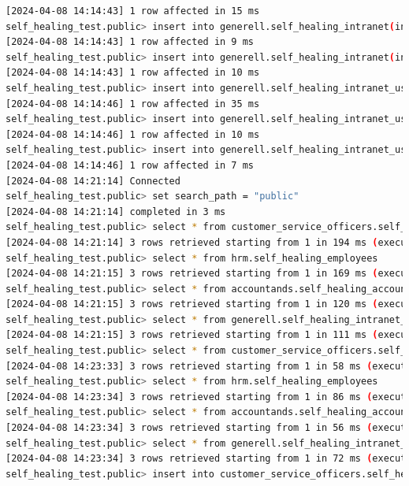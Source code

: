 \begin{flushleft}
\begin{lstlisting}[language=bash, caption=yugabyteDB - Evaluation-Testing,captionpos=b,label={lst:yugabytedb-evaluation-testing},breaklines=true]
[2024-04-08 14:14:43] 1 row affected in 15 ms
self_healing_test.public> insert into generell.self_healing_intranet(intranet_id, content) VALUES (500, 'bla bla')
[2024-04-08 14:14:43] 1 row affected in 9 ms
self_healing_test.public> insert into generell.self_healing_intranet(intranet_id, content) VALUES (1000, 'talking and talking')
[2024-04-08 14:14:43] 1 row affected in 10 ms
self_healing_test.public> insert into generell.self_healing_intranet_users(intranet_user_id, employees_id) values(100, 100)
[2024-04-08 14:14:46] 1 row affected in 35 ms
self_healing_test.public> insert into generell.self_healing_intranet_users(intranet_user_id, employees_id) values(200, 200)
[2024-04-08 14:14:46] 1 row affected in 10 ms
self_healing_test.public> insert into generell.self_healing_intranet_users(intranet_user_id, employees_id) values(300, 300)
[2024-04-08 14:14:46] 1 row affected in 7 ms
[2024-04-08 14:21:14] Connected
self_healing_test.public> set search_path = "public"
[2024-04-08 14:21:14] completed in 3 ms
self_healing_test.public> select * from customer_service_officers.self_healing_accounts
[2024-04-08 14:21:14] 3 rows retrieved starting from 1 in 194 ms (execution: 28 ms, fetching: 166 ms)
self_healing_test.public> select * from hrm.self_healing_employees
[2024-04-08 14:21:15] 3 rows retrieved starting from 1 in 169 ms (execution: 22 ms, fetching: 147 ms)
self_healing_test.public> select * from accountands.self_healing_accountand_protocol
[2024-04-08 14:21:15] 3 rows retrieved starting from 1 in 120 ms (execution: 11 ms, fetching: 109 ms)
self_healing_test.public> select * from generell.self_healing_intranet_users
[2024-04-08 14:21:15] 3 rows retrieved starting from 1 in 111 ms (execution: 7 ms, fetching: 104 ms)
self_healing_test.public> select * from customer_service_officers.self_healing_accounts
[2024-04-08 14:23:33] 3 rows retrieved starting from 1 in 58 ms (execution: 7 ms, fetching: 51 ms)
self_healing_test.public> select * from hrm.self_healing_employees
[2024-04-08 14:23:34] 3 rows retrieved starting from 1 in 86 ms (execution: 9 ms, fetching: 77 ms)
self_healing_test.public> select * from accountands.self_healing_accountand_protocol
[2024-04-08 14:23:34] 3 rows retrieved starting from 1 in 56 ms (execution: 6 ms, fetching: 50 ms)
self_healing_test.public> select * from generell.self_healing_intranet_users
[2024-04-08 14:23:34] 3 rows retrieved starting from 1 in 72 ms (execution: 6 ms, fetching: 66 ms)
self_healing_test.public> insert into customer_service_officers.self_healing_accounts (account_id, firstname, lastname, birthday) VALUES (400, 'i', 'j', '01.01.2005')

\end{lstlisting}
\end{flushleft}

